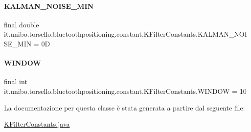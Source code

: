 \paragraph{\texorpdfstring{K\+A\+L\+M\+A\+N\+\_\+\+N\+O\+I\+S\+E\+\_\+\+M\+IN}{KALMAN\_NOISE\_MIN}}
{\footnotesize\ttfamily final double it.\+unibo.\+torsello.\+bluetoothpositioning.\+constant.\+K\+Filter\+Constants.\+K\+A\+L\+M\+A\+N\+\_\+\+N\+O\+I\+S\+E\+\_\+\+M\+IN = 0D\hspace{0.3cm}{\ttfamily [static]}}

\hypertarget{classit_1_1unibo_1_1torsello_1_1bluetoothpositioning_1_1constant_1_1KFilterConstants_a3c2618e53ad77fcb50785f62868e4c9c_a3c2618e53ad77fcb50785f62868e4c9c}{}\label{classit_1_1unibo_1_1torsello_1_1bluetoothpositioning_1_1constant_1_1KFilterConstants_a3c2618e53ad77fcb50785f62868e4c9c_a3c2618e53ad77fcb50785f62868e4c9c} 
\paragraph{\texorpdfstring{W\+I\+N\+D\+OW}{WINDOW}}
{\footnotesize\ttfamily final int it.\+unibo.\+torsello.\+bluetoothpositioning.\+constant.\+K\+Filter\+Constants.\+W\+I\+N\+D\+OW = 10\hspace{0.3cm}{\ttfamily [static]}}



La documentazione per questa classe è stata generata a partire dal seguente file\+:\begin{DoxyCompactItemize}
\item 
\hyperlink{KFilterConstants_8java}{K\+Filter\+Constants.\+java}\end{DoxyCompactItemize}
